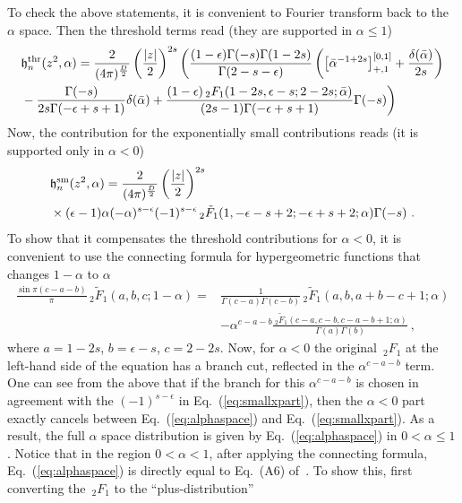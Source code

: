 \documentclass[a4paper,11pt]{article}
\begin{document}
To check the above statements,  it is convenient to Fourier transform back to the $\alpha$ space. Then the threshold terms read (they are supported in $\alpha \le 1$)
\begin{align}\label{eq:alphaspace}
& \mathfrak{h}_n^{\rm thr}(z^2,\alpha)=\frac{2}{(4\pi)^{\frac{D}{2}}}\left(\frac{|z|}{2}\right)^{2s}\bigg(\frac{(1-\epsilon)\Gamma(-s)\Gamma(1-2s)}{\Gamma(2-s-\epsilon)} \left(\left [\bar \alpha^{-1+2s} \right]^{[0,1]}_{+,1} + \frac{\delta(\bar \alpha)}{2s}\right) \nonumber \\ 
&-\frac{\Gamma (-s)}{2s \Gamma (-\epsilon+s+1)}\delta(\bar \alpha)+\frac{(1-\epsilon) \, _2F_1(1-2 s,\epsilon-s;2-2 s;\bar \alpha)}{(2 s-1) \Gamma (-\epsilon+s+1)} \Gamma (-s) \bigg)
\end{align}
Now, the contribution for the exponentially small contributions reads (it is supported only in $\alpha<0$)
\begin{align} \label{eq:smallxpart}
& \mathfrak{h}_n^{\rm sm}(z^2,\alpha)=\frac{ 2}{(4\pi)^{\frac{D}{2}}}\left(\frac{|z|}{2}\right)^{2s}\nonumber \\ 
& \times (\epsilon-1) \alpha  (-\alpha)^{s-\epsilon}(-1)^{s-\epsilon} \, _2\tilde{F}_1(1,-\epsilon-s+2;-\epsilon+s+2;\alpha)\Gamma (-s) \ .
\end{align}
To show that it compensates the threshold contributions for $\alpha<0$, it is convenient to use the connecting formula for hypergeometric functions that changes $1-\alpha$ to $\alpha$
\begin{align}
\frac{\sin \pi(c-a-b)}{\pi}\, _2\tilde F_1(a,b,c;1-\alpha)=&\frac{1}{\Gamma(c-a)\Gamma(c-b)}\, _2\tilde F_1(a,b,a+b-c+1;\alpha)\nonumber \\ 
&-\alpha^{c-a-b}\frac{\, _2\tilde F_1(c-a,c-b,c-a-b+1;\alpha)}{\Gamma(a)\Gamma(b)} \ ,
\end{align}
where $a=1-2s$, $b=\epsilon-s$, $c=2-2s$. Now, for $\alpha<0$ the original $\, _2F_1$ at the left-hand side of the equation has a branch cut, reflected in the $\alpha^{c-a-b}$ term. One can see from the above that if the branch for this $\alpha^{c-a-b}$ is chosen in agreement with the $(-1)^{s-\epsilon}$ in Eq.~(\ref{eq:smallxpart}), then the $\alpha<0$ part exactly cancels between Eq.~(\ref{eq:alphaspace}) and Eq.~(\ref{eq:smallxpart}). As a result, the full $\alpha$ space distribution is given by Eq.~(\ref{eq:alphaspace}) in $0<\alpha \le 1$. Notice that in the region $0<\alpha<1$, after applying the connecting formula,  Eq.~(\ref{eq:alphaspace}) is directly equal to Eq.~(A6) of~\cite{Braun:2018brg}. To show this, first converting the $\, _2F_1$ to the ``plus-distribution''
\end{document}
